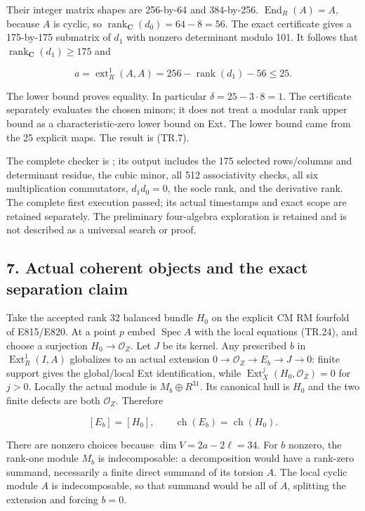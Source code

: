 Their integer matrix shapes are 256-by-64 and 384-by-256. \(\operatorname{End}_R(A)=A\),
because \(A\) is cyclic, so \(\operatorname{rank}_{\mathbf C}(d_0)=64-8=56\). The exact certificate
gives a 175-by-175 submatrix of \(d_1\) with nonzero determinant modulo 101.
It follows that \(\operatorname{rank}_{\mathbf C}(d_1)\ge175\) and

\[
 a=\operatorname{ext}^1_R(A,A)
       =256-\operatorname{rank}(d_1)-56\le25.
 \tag{TR.27}
\]

The lower bound proves equality. In particular \(\delta=25-3\cdot8=1\).
The certificate separately evaluates the chosen minors; it does not
treat a modular rank upper bound as a characteristic-zero lower bound
on Ext. The lower bound came from the 25 explicit maps. The result
is (TR.7).

The complete checker is \texttt{}; its
output includes the 175 selected rows/columns and determinant residue,
the cubic minor, all 512 associativity checks, all six multiplication
commutators, \(d_1d_0=0\), the socle rank, and the derivative rank.
The complete first execution passed; its actual timestamps and exact
scope are retained separately. The preliminary four-algebra exploration
is retained and is not described as a universal search or proof.

\subsection{7. Actual coherent objects and the exact separation claim}\label{SF-E850:s7}

Take the accepted rank 32 balanced bundle \(H_0\) on the explicit CM RM
fourfold of E815/E820. At a point \(p\) embed \(\operatorname{Spec}A\) with the local
equations (TR.24), and choose a surjection \(H_0\to\mathcal O_Z\). Let \(J\) be its
kernel. Any prescribed \(b\) in \(\operatorname{Ext}^1_R(I,A)\) globalizes to an actual
extension \(0\to\mathcal O_Z\to E_b\to J\to0\): finite support gives the global/local
Ext identification, while \(\operatorname{Ext}^j_X(H_0,\mathcal O_Z)=0\) for \(j>0\). Locally
the actual module is \(M_b\oplus R^{31}\). Its canonical hull is \(H_0\) and
the two finite defects are both \(\mathcal O_Z\). Therefore

\[
                   [E_b]=[H_0],\qquad
                   \operatorname{ch}(E_b)=\operatorname{ch}(H_0).
 \tag{TR.28}
\]

There are nonzero choices because \(\dim V=2a-2\ell=34\). For \(b\) nonzero,
the rank-one module \(M_b\) is indecomposable: a decomposition would have
a rank-zero summand, necessarily a finite direct summand of its torsion
\(A\). The local cyclic module \(A\) is indecomposable, so that summand would
be all of \(A\), splitting the extension and forcing \(b=0\).

